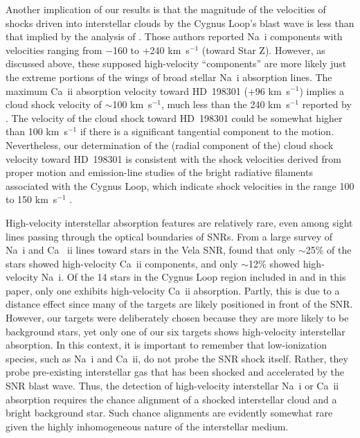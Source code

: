 \documentclass[fleqn,usenatbib]{mnras}
\begin{document}
Another implication of our results is that the magnitude of the velocities of shocks driven into interstellar clouds by the Cygnus Loop's blast wave is less than that implied by the analysis of \citet{f18b}. Those authors reported Na~{\sc i} components with velocities ranging from $-$160 to +240 km~s$^{-1}$ (toward Star Z). However, as discussed above, these supposed high-velocity ``components'' are more likely just the extreme portions of the wings of broad stellar Na~{\sc i} absorption lines. The maximum Ca~{\sc ii} absorption velocity toward HD~198301 (+96 km~s$^{-1}$) implies a cloud shock velocity of $\sim$100 km~s$^{-1}$, much less than the 240 km~s$^{-1}$ reported by \citet{f18b}. The velocity of the cloud shock toward HD~198301 could be somewhat higher than 100 km~s$^{-1}$ if there is a significant tangential component to the motion. Nevertheless, our determination of the (radial component of the) cloud shock velocity toward HD~198301 is consistent with the shock velocities derived from proper motion and emission-line studies of the bright radiative filaments associated with the Cygnus Loop, which indicate shock velocities in the range 100 to 150 km~s$^{-1}$ \citep[e.g.,][]{ray20}.

High-velocity interstellar absorption features are relatively rare, even among sight lines passing through the optical boundaries of SNRs. From a large survey of Na~{\sc i} and Ca ~{\sc ii} lines toward stars in the Vela SNR, \citet{cs00} found that only $\sim$25\% of the stars showed high-velocity Ca~{\sc ii} components, and only $\sim$12\% showed high-velocity Na~{\sc i}. Of the 14 stars in the Cygnus Loop region included in \citet{w02} and in this paper, only one exhibits high-velocity Ca~{\sc ii} absorption. Partly, this is due to a distance effect since many of the \citet{w02} targets are likely positioned in front of the SNR. However, our targets were deliberately chosen because they are more likely to be background stars, yet only one of our six targets shows high-velocity interstellar absorption. In this context, it is important to remember that low-ionization species, such as Na~{\sc i} and Ca~{\sc ii}, do not probe the SNR shock itself. Rather, they probe pre-existing interstellar gas that has been shocked and accelerated by the SNR blast wave. Thus, the detection of high-velocity interstellar Na~{\sc i} or Ca~{\sc ii} absorption requires the chance alignment of a shocked interstellar cloud and a bright background star. Such chance alignments are evidently somewhat rare given the highly inhomogeneous nature of the interstellar medium.
\end{document}
